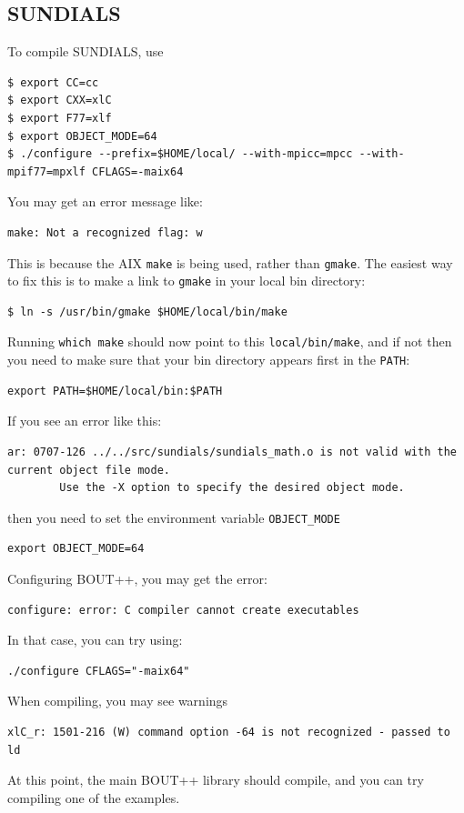 \documentclass[12pt]{article}
\newcommand{\code}[1]{\texttt{#1}}
\begin{document}
\subsection{SUNDIALS}
%
To compile SUNDIALS, use
%
\begin{verbatim}
$ export CC=cc
$ export CXX=xlC
$ export F77=xlf
$ export OBJECT_MODE=64
$ ./configure --prefix=$HOME/local/ --with-mpicc=mpcc --with-mpif77=mpxlf CFLAGS=-maix64
\end{verbatim}
%
You may get an error message like:
%
\begin{verbatim}
make: Not a recognized flag: w
\end{verbatim}
%
This is because the AIX \code{make} is being used, rather than \code{gmake}.
The easiest way to fix this is to make a link to \code{gmake} in your local bin
directory:
%
\begin{verbatim}
$ ln -s /usr/bin/gmake $HOME/local/bin/make
\end{verbatim}
%
Running \code{which make} should now point to this \code{local/bin/make}, and
if not then you need to make sure that your bin directory appears first in the
\code{PATH}:
%
\begin{verbatim}
export PATH=$HOME/local/bin:$PATH
\end{verbatim}
%
If you see an error like this:
%
\begin{verbatim}
ar: 0707-126 ../../src/sundials/sundials_math.o is not valid with the current object file mode.
        Use the -X option to specify the desired object mode.
\end{verbatim}
%
then you need to set the environment variable \code{OBJECT\_MODE}
%
\begin{verbatim}
export OBJECT_MODE=64
\end{verbatim}
%
Configuring BOUT++, you may get the error:
%
\begin{verbatim}
configure: error: C compiler cannot create executables
\end{verbatim}
%
In that case, you can try using:
%
\begin{verbatim}
./configure CFLAGS="-maix64"
\end{verbatim}
%
When compiling, you may see warnings
%
\begin{verbatim}
xlC_r: 1501-216 (W) command option -64 is not recognized - passed to ld
\end{verbatim}
%
At this point, the main BOUT++ library should compile, and you can try
compiling one of the examples.
\end{document}
